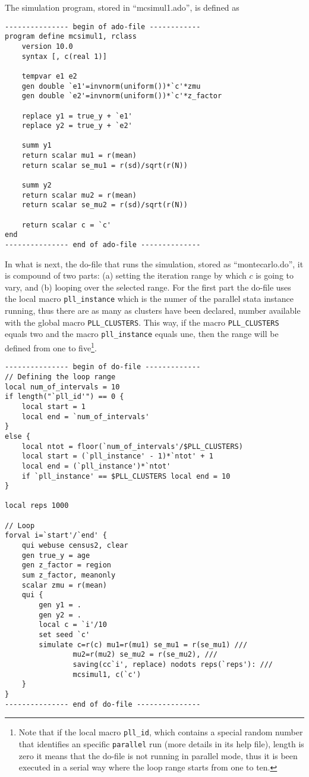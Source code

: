 \documentclass[letterpaper, 10pt]{article}
\begin{document}
The simulation program, stored in ``mcsimul1.ado'', is defined as
\bigskip

\begin{Verbatim}[tabsize=4, fontsize=\footnotesize]
--------------- begin of ado-file ------------
program define mcsimul1, rclass
	version 10.0
	syntax [, c(real 1)]
	
	tempvar e1 e2
	gen double `e1'=invnorm(uniform())*`c'*zmu
	gen double `e2'=invnorm(uniform())*`c'*z_factor
	
	replace y1 = true_y + `e1'
	replace y2 = true_y + `e2'
	
	summ y1
	return scalar mu1 = r(mean)
	return scalar se_mu1 = r(sd)/sqrt(r(N))
	
	summ y2
	return scalar mu2 = r(mean)
	return scalar se_mu2 = r(sd)/sqrt(r(N))
	
	return scalar c = `c'
end
--------------- end of ado-file --------------
\end{Verbatim}
\bigskip

In what is next, the do-file that runs the simulation, stored as ``montecarlo.do'', it is compound of two parts: (a) setting the iteration range by which $c$ is going to vary, and (b) looping over the selected range. For the first part the do-file uses the local macro {\tt pll\_instance} which is the numer of the parallel stata instance running, thus there are as many as clusters have been declared, number available with the global macro {\tt PLL\_CLUSTERS}. This way, if the macro {\tt PLL\_CLUSTERS} equals two and the macro {\tt pll\_instance} equals une, then the range will be defined from one to five\footnote{Note that if the local macro {\tt pll\_id}, which contains a special random number that identifies an specific {\tt parallel} run (more details in its help file), length is zero it means that the do-file is not running in parallel mode, thus it is been executed in a serial way where the loop range starts from one to ten.}.
\bigskip

\begin{Verbatim}[tabsize=4, fontsize=\footnotesize]
--------------- begin of do-file -------------
// Defining the loop range
local num_of_intervals = 10
if length("`pll_id'") == 0 {
	local start = 1
	local end = `num_of_intervals'
}
else {
	local ntot = floor(`num_of_intervals'/$PLL_CLUSTERS)
	local start = (`pll_instance' - 1)*`ntot' + 1
	local end = (`pll_instance')*`ntot'
	if `pll_instance' == $PLL_CLUSTERS local end = 10
}

local reps 1000

// Loop
forval i=`start'/`end' {
	qui webuse census2, clear
	gen true_y = age
	gen z_factor = region
	sum z_factor, meanonly
	scalar zmu = r(mean)
	qui {
		gen y1 = .
		gen y2 = .
		local c = `i'/10
		set seed `c'
		simulate c=r(c) mu1=r(mu1) se_mu1 = r(se_mu1) ///
				mu2=r(mu2) se_mu2 = r(se_mu2), /// 
				saving(cc`i', replace) nodots reps(`reps'): ///
				mcsimul1, c(`c')
	}
}
--------------- end of do-file ---------------
\end{Verbatim}
\bigskip
\end{document}
